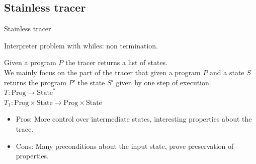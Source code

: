 \documentclass{EESD}
\begin{document}
\subsection{Stainless tracer}
\begin{frame}{Stainless tracer}

    Interpreter problem with whiles: non termination. \\ 

    \pause

    Given a program \(P\) the tracer returns a list of states.\\
    We mainly focus on the part of the tracer that given a program \(P\) and a state \(S\) returns the program \(P'\) the state \(S'\) given by one step of execution.
    \\
    \centering \(T: \text{Prog} \to \text{State}^*\)
    \\
    \centering \(T_1: \text{Prog} \times \text{State} \to \text{Prog} \times \text{State}\)
    \\

    \pause


    \begin{itemize}
        \item Pros: More control over intermediate states, interesting properties about the trace.
        \item Cons: Many preconditions about the input state, prove preservation of properties. 
    \end{itemize}



\end{frame}

\end{document}

